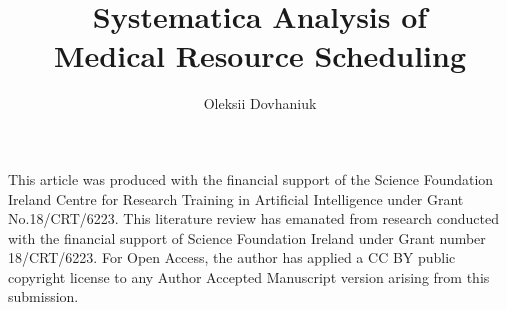 \title{ 
	Systematica Analysis of \\[.3em]
	Medical Resource Scheduling
}
\author{Oleksii Dovhaniuk}

\maketitle
\makedeclaration
\begin{acknowledgements}
	
	This article was produced with the financial support of the Science Foundation Ireland Centre for Research Training in Artificial Intelligence under Grant No.18/CRT/6223. This literature review has emanated from research conducted with the financial support of Science Foundation Ireland under Grant number 18/CRT/6223. For Open Access, the author has applied a CC BY public copyright license to any Author Accepted Manuscript version arising from this submission.

\end{acknowledgements}

\setcounter{tocdepth}{2} 


\tableofcontents

